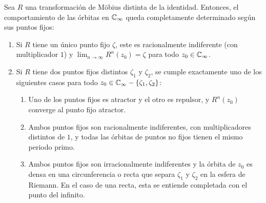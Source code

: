 \begin{proposicion}
  \label{prp:dinamica_mobius}
  Sea $R$ una transformación de Möbius distinta de la identidad. Entonces, el
  comportamiento de las órbitas en $\mathbb{C}_\infty$ queda completamente determinado
  según sus puntos fijos:
  \begin{enumerate}[label=(\arabic*)]
    \item Si $R$ tiene un único punto fijo $\zeta$, este es racionalmente
          indiferente (con multiplicador $1$) y $\lim_{n \to \infty} R^n(z_0) =
          \zeta$ para todo $z_0 \in \mathbb{C}_\infty$.
    \item Si $R$ tiene dos puntos fijos distintos $\zeta_1$ y $\zeta_2$, se
          cumple exactamente uno de los siguientes casos para todo $z_0 \in
          \mathbb{C}_\infty - \{\zeta_1, \zeta_2\}$:
          \begin{enumerate}[label=(\alph*)]
            \item Uno de los puntos fijos es atractor y el otro es repulsor, y
                  $R^n(z_0)$ converge al punto fijo atractor. \label{itm:mobius_dos_convergente}
            \item Ambos puntos fijos son racionalmente indiferentes, con
                  multiplicadores distintos de $1$, y todas las órbitas de
                  puntos no fijos tienen el mismo periodo primo.
            \item Ambos puntos fijos son irracionalmente indiferentes y la
                  órbita de $z_0$ es densa en una circunferencia o recta que
                  separa $\zeta_1$ y $\zeta_2$ en la esfera de Riemann. En el
                  caso de una recta, esta se entiende completada con el punto
                  del infinito.
          \end{enumerate}
  \end{enumerate}
\end{proposicion}
